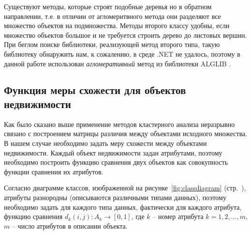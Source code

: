 \documentclass[a4paper,14pt,openany,final]{extreport} %
\begin{document}
{Существуют методы, которые строят подобные деревья но в обратном направлении, т.е. в отличии от агломеритвного метода они разделяют все множество объектов на подмножества.  Методы второго классу удобны, если множество объектов большое и не требуется строить дерево до листовых вершин. При беглом поиске библиотеки, реализующей метод второго типа, такую библиотеку обнаружить нам, к сожалению, в среде .NET не удалось, поэтому в данной работе использован \emph{агломеративный} метод из библиотеки \textsc{ALGLIB} \cite{alglib}.

\subsection{Функция меры схожести для объектов недвижимости}

Как было сказано выше применение методов кластерного анализа неразрывно связано с построением матрицы различия между объектами исходного множества. В нашем случае необходимо задать меру схожести между объектами недвижимости. Каждый объект недвижимости задан атрибутами, поэтому необходимо построить функцию сравнения двух объектов как совокупность функции сравнения их атрибутов.

Согласно диаграмме классов, изображенной на рисунке~\ref{fig:classdiagram} (стр.~\pageref{fig:classdiagram}), атрибуты разнородны (описываются различными типами данных), поэтому необходимо задать для каждого типа данных, фактически для каждого атрибута, функцию сравнения $d_k(i,j):A_k\to [0,1]$, где $k$ -- номер атрибута $k=1,2,\ldots,m$, $m$ -- число атрибутов в описании объекта.

}
\end{document}
